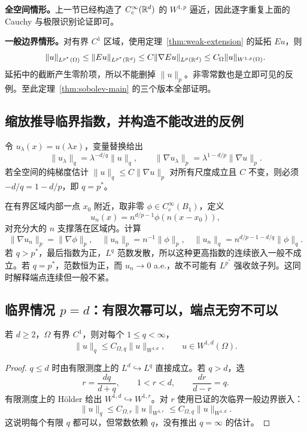 \textbf{全空间情形。}上一节已经构造了 $C_c^\infty(\mathbb R^d)$ 的 $W^{1,p}$ 逼近，因此逐字重复上面的 Cauchy 与极限识别论证即可。

\textbf{一般边界情形。}对有界 $C^1$ 区域，使用定理~\ref{thm:weak-extension} 的延拓 $Eu$，则
\[
 \|u\|_{L^{p^*}(\Omega)}
 \le\|Eu\|_{L^{p^*}(\mathbb R^d)}
 \le C\|\nabla Eu\|_{L^p(\mathbb R^d)}
 \le C_\Omega\|u\|_{W^{1,p}(\Omega)}.
\]
延拓中的截断产生零阶项，所以不能删掉 $\|u\|_p$。非零常数也是立即可见的反例。至此定理~\ref{thm:sobolev-main} 的三个版本全部证明。

\subsection{缩放推导临界指数，并构造不能改进的反例}

令 $u_\lambda(x)=u(\lambda x)$，变量替换给出
\[
 \|u_\lambda\|_q=\lambda^{-d/q}\|u\|_q,\qquad
 \|\nabla u_\lambda\|_p=\lambda^{1-d/p}\|\nabla u\|_p.
\]
若全空间的纯梯度估计 $\|u\|_q\le C\|\nabla u\|_p$ 对所有尺度成立且 $C$ 不变，则必须 $-d/q=1-d/p$，即 $q=p^*$。

在有界区域内部一点 $x_0$ 附近，取非零 $\phi\in C_c^\infty(B_1)$，定义
\[
 u_n(x)=n^{d/p-1}\phi(n(x-x_0)),
\]
对充分大的 $n$ 支撑落在区域内。计算
\begin{equation}
 \|\nabla u_n\|_p=\|\nabla\phi\|_p,\quad
 \|u_n\|_p=n^{-1}\|\phi\|_p,\quad
 \|u_n\|_q=n^{d/p-1-d/q}\|\phi\|_q.
 \label{eq:sobolev-concentration}
\end{equation}
若 $q>p^*$，最后指数为正，$L^q$ 范数发散，所以这种更高指数的连续嵌入一般不成立。若 $q=p^*$，范数恒为正，而 $u_n\to0$ a.e.，故不可能有 $L^{p^*}$ 强收敛子列。这同时解释端点连续但一般不紧。

\subsection{临界情况 \texorpdfstring{$p=d$}{p=d}：有限次幂可以，端点无穷不可以}

\begin{theorem}[临界有限指数嵌入]\label{thm:sobolev-critical}
若 $d\ge2$，$\Omega$ 有界 $C^1$，则对每个 $1\le q<\infty$，
\[
 \|u\|_q\le C_{\Omega,q}\|u\|_{W^{1,d}},
 \qquad u\in W^{1,d}(\Omega).
\]
\end{theorem}
\begin{proof}
$q\le d$ 时由有限测度上的 $L^d\hookrightarrow L^q$ 直接成立。若 $q>d$，选
\[
 r=\frac{dq}{d+q},\qquad1<r<d,\qquad\frac{dr}{d-r}=q.
\]
有限测度上的 H\"older 给出 $W^{1,d}\hookrightarrow W^{1,r}$。对 $r$ 使用已证的次临界一般边界嵌入：
\[
 \|u\|_q\le C_{\Omega,r}\|u\|_{W^{1,r}}
 \le C_{\Omega,q}\|u\|_{W^{1,d}}.
\]
这说明每个有限 $q$ 都可以，但常数依赖 $q$，没有推出 $q=\infty$ 的估计。
\end{proof}


